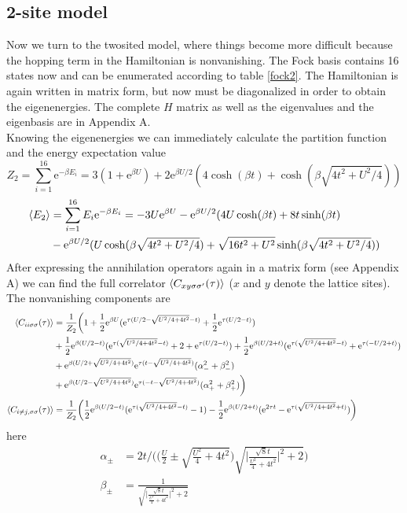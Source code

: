 \subsection{2-site model}
Now we turn to the twosited model, where things become more difficult because the hopping term in the Hamiltonian is nonvanishing. The Fock basis contains 16 states now and can be enumerated according to table \ref{fock2}. The Hamiltonian is again written in matrix form, but now must be diagonalized in order to obtain the eigenenergies. The complete $H$ matrix as well as the eigenvalues and the eigenbasis are in Appendix A. \\
Knowing the eigenenergies we can immediately calculate the partition function and the energy expectation value
\begin{equation}
	Z_2=\sum_{i=1}^{16}\text{e}^{-\beta E_i}= 3(1+\text{e}^{\beta U})+2\text{e}^{\beta U/2}(4\cosh(\beta t)+\cosh(\beta\sqrt{4t^2+U^2/4}))
\end{equation}
\begin{align}
	\braket{E_2}&= \sum_{i=1}^{16}E_i\text{e}^{-\beta E_i} = -3U\text{e}^{\beta U}-\text{e}^{\beta U/2}(4U\cosh(\beta t)+8t\sinh(\beta t)\\&-\text{e}^{\beta U/2}(U\cosh(\beta\sqrt{4t^2+U^2/4})+\sqrt{16t^2+U^2}\sinh(\beta\sqrt{4t^2+U^2/4}))\nonumber
\end{align}
After expressing the annihilation operators again in a matrix form (see Appendix A) we can find the full correlator $\braket{C_{xy\sigma\sigma^{\prime}}(\tau)}$ ($x$ and $y$ denote the lattice sites). The nonvanishing components are
\begin{align*}
\braket{C_{ii\sigma\sigma}(\tau)}&= \frac{1}{Z_2}\biggl(1+\frac{1}{2}\text{e}^{\beta U}(\text{e}^{\tau(U/2-\sqrt{U^2/4+4t^2}-t)}+\frac{1}{2}\text{e}^{\tau(U/2-t)})\\&+\frac{1}{2}\text{e}^{\beta(U/2-t)}(\text{e}^{\tau(\sqrt{U^2/4+4t^2}-t)}+2+\text{e}^{\tau(U/2-t)})+\frac{1}{2}\text{e}^{\beta(U/2+t)}(\text{e}^{\tau(\sqrt{U^2/4+4t^2}-t)}+\text{e}^{\tau(-U/2+t)})\\&+\text{e}^{\beta(U/2+\sqrt{U^2/4+4t^2})}\text{e}^{\tau(t-\sqrt{U^2/4+4t^2})}(\alpha_-^2+\beta_-^2)\\&+\text{e}^{\beta(U/2-\sqrt{U^2/4+4t^2})}\text{e}^{\tau(-t-\sqrt{U^2/4+4t^2})}(\alpha_+^2+\beta_+^2)\biggr)\\
\braket{C_{i\neq j,\sigma\sigma}(\tau)}&= \frac{1}{Z_2}\biggl(\frac{1}{2}\text{e}^{\beta(U/2-t)}(\text{e}^{\tau(\sqrt{U^2/4+4t^2}-t)}-1)-\frac{1}{2}\text{e}^{\beta(U/2+t)}(\text{e}^{2\tau t}-\text{e}^{\tau(\sqrt{U^2/4+4t^2}+t)})\biggr)
\end{align*}
here
\begin{align*}
\alpha_{\pm}&= 2t\biggl/\biggl(\biggl(\frac{U}{2}\pm\sqrt{\frac{U^2}{4}+4t^2}\biggr)\sqrt{\biggl|\frac{\sqrt{8} t}{\frac{U^2}{4}+4t^2}\biggr|^2+2}\biggr)\\
\beta_{\pm}&= \frac{1}{\sqrt{\biggl|\frac{\sqrt{8} t}{\frac{U^2}{4}+4t^2}\biggr|^2+2}}
\end{align*}
